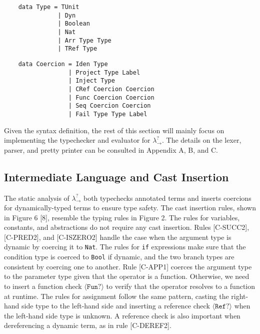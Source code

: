 \begin{lstlisting}
    data Type = TUnit         
               | Dyn            
               | Boolean          
               | Nat            
               | Arr Type Type 
               | TRef Type      
\end{lstlisting}

\begin{lstlisting}
    data Coercion = Iden Type              
                  | Project Type Label     
                  | Inject Type             
                  | CRef Coercion Coercion  
                  | Func Coercion Coercion  
                  | Seq Coercion Coercion   
                  | Fail Type Type Label
\end{lstlisting}  

Given the syntax definition, the rest of this section will mainly focus on 
implementing the typechecker and 
evaluator for $\lambda ^? _{\rightarrow}$. The details on the 
lexer, parser, and pretty printer can be consulted in 
Appendix A, B, and C.

\subsection{Intermediate Language and Cast Insertion}
The static analysis of $\lambda ^? _{\rightarrow}$ both 
typechecks annotated terms and inserts coercions for 
dynamically-typed terms to ensure type safety. The cast insertion 
rules, shown in Figure 6 [8], resemble the typing rules in 
Figure 2. 
The rules for variables, constants, and 
abstractions do not require any cast insertion. Rules {\scriptsize{[C-SUCC2]}}, 
{\scriptsize{[C-PRED2]}}, and {\scriptsize{[C-ISZERO2]}} handle the 
case when the argument type is dynamic by coercing it to \texttt{Nat}. 
The rules for \texttt{if} expressions make sure that the condition 
type is coerced to \texttt{Bool} if dynamic, and the two branch 
types are consistent by coercing one to another. Rule 
{\scriptsize{[C-APP1]}} coerces the argument type to the parameter 
type given that the operator is a function. Otherwise, we need to 
insert a function check $\langle \texttt{Fun}? \rangle$ to verify 
that the operator resolves to a function at runtime. The rules for 
assignment follow the same pattern, casting the right-hand side type 
to the left-hand side and inserting a reference check 
$\langle \texttt{Ref}? \rangle$ when the left-hand side type is 
unknown. A reference check is also important when dereferencing a 
dynamic term, as in rule {\scriptsize{[C-DEREF2]}}.


